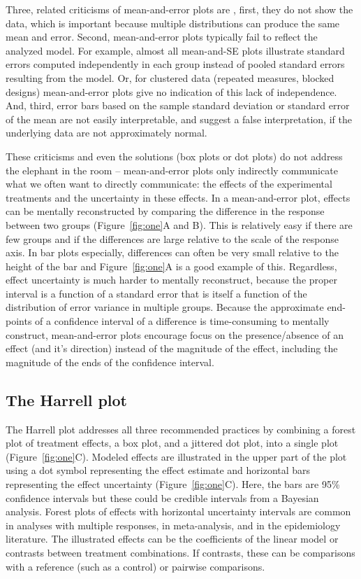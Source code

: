 \documentclass[fleqn,10pt,lineno]{wlpeerj} %
\begin{document}
Three, related criticisms of mean-and-error plots are \citep{Drummond_Show_2011,Weissgerber_Bar_2015,Rousselet_few_2016}, first, they do not show the data, which is important because multiple distributions can produce the same mean and error. Second, mean-and-error plots typically fail to reflect the analyzed model. For example, almost all mean-and-SE plots illustrate standard errors computed independently in each group instead of pooled standard errors resulting from the model. Or, for clustered data (repeated measures, blocked designs) mean-and-error plots give no indication of this lack of independence. And, third, error bars based on the sample standard deviation or standard error of the mean are not easily interpretable, and suggest a false interpretation, if the underlying data are not approximately normal.

These criticisms and even the solutions (box plots or dot plots) do not address the elephant in the room -- mean-and-error plots only indirectly communicate what we often want to directly communicate: the effects of the experimental treatments and the uncertainty in these effects. In a mean-and-error plot, effects can be mentally reconstructed by comparing the difference in the response between two groups (Figure~\ref{fig:one}A and B). This is relatively easy if there are few groups and if the differences are large relative to the scale of the response axis. In bar plots especially, differences can often be very small relative to the height of the bar and Figure~\ref{fig:one}A is a good example of this. Regardless, effect uncertainty is much harder to mentally reconstruct, because the proper interval is a function of a standard error that is itself a function of the distribution of error variance in multiple groups. Because the approximate end-points of a confidence interval of a difference is time-consuming to mentally construct, mean-and-error plots encourage focus on the presence/absence of an effect (and it's direction) instead of the magnitude of the effect, including the magnitude of the ends of the confidence interval.

\subsection*{The Harrell plot}
The Harrell plot addresses all three recommended practices by combining a forest plot of treatment effects, a box plot, and a jittered dot plot, into a single plot (Figure~\ref{fig:one}C). Modeled effects are illustrated in the upper part of the plot using a dot symbol representing the effect estimate and horizontal bars representing the effect uncertainty (Figure~\ref{fig:one}C). Here, the bars are 95\% confidence intervals but these could be credible intervals from a Bayesian analysis. Forest plots of effects with horizontal uncertainty intervals are common in analyses with multiple responses, in meta-analysis, and in the epidemiology literature. The illustrated effects can be the coefficients of the linear model or contrasts between treatment combinations. If contrasts, these can be comparisons with a reference (such as a control) or pairwise comparisons.
\end{document}
